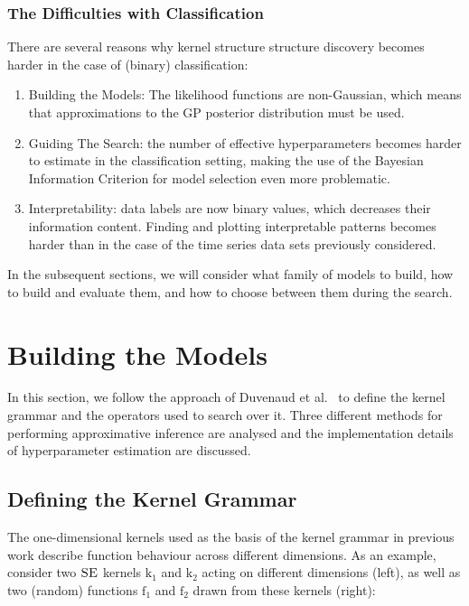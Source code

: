 \documentclass[a4paper,12pt ]{report}
\begin{document}
\subsubsection*{The Difficulties with Classification}

There are several reasons why kernel structure structure discovery becomes harder in the case of (binary) classification:

\begin{enumerate}
\item Building the Models: The likelihood functions are non-Gaussian, which means that approximations to the GP posterior distribution must be used.
\item Guiding The Search: the number of effective hyperparameters becomes harder to estimate in the classification setting, making the use of the Bayesian Information Criterion for model selection even more problematic.
\item Interpretability: data labels are now binary values, which decreases their information content. Finding and plotting interpretable patterns becomes harder than in the case of the time series data sets previously considered.
\end{enumerate}

In the subsequent sections, we will consider what family of models to build, how to build and evaluate them, and how to choose between them during the search.

\section{Building the Models}

In this section, we follow the approach of Duvenaud et al.~\cite{duvenaud13} to define the kernel grammar and the operators used to search over it. Three different methods for performing approximative inference are analysed and the implementation details of hyperparameter estimation are discussed.

\subsection{Defining the Kernel Grammar}

The one-dimensional kernels used as the basis of the kernel grammar in previous work describe function behaviour across different dimensions. As an example, consider two $\textsc{SE}$ kernels $\mathrm{k_1}$ and $\mathrm{k_2}$ acting on different dimensions (left), as well as two (random) functions $\mathrm{f_1}$ and $\mathrm{f_2}$ drawn from these kernels (right):
\end{document}
